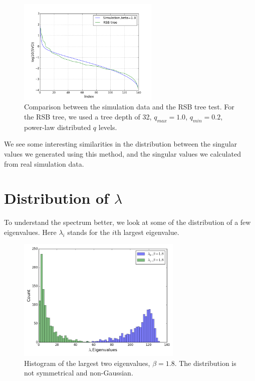 \begin{enumerate}
\begin{figure}[ht]
  \centering
  \includegraphics[width=0.6\textwidth]{img/matrix/svd_compare_rsb.png}
  \caption{Comparison between the simulation data and the RSB tree test. For the RSB tree,
we used a tree depth of 32, $q_{max}=1.0$, $q_{min}=0.2$, power-law distributed $q$ levels.}
  \label{fig:compare}
\end{figure}


We see some interesting similarities in the distribution between the
singular values we generated using this method, and the singular values we 
calculated from real simulation data.

\end{enumerate}

\section{Distribution of $\lambda$}

To understand the spectrum better, we look at some of the distribution of 
a few eigenvalues. Here $\lambda_i$ stands for the $i$th largest eigenvalue.
 
\begin{figure}[ht]
\centering
  \includegraphics[width=0.7\textwidth]{img/matrix/eigHist1.png} 
\caption{Histogram of the largest two eigenvalues, $\beta=1.8$. The distribution 
is not symmetrical and non-Gaussian.}
\label{fig:hist1}
\end{figure}

